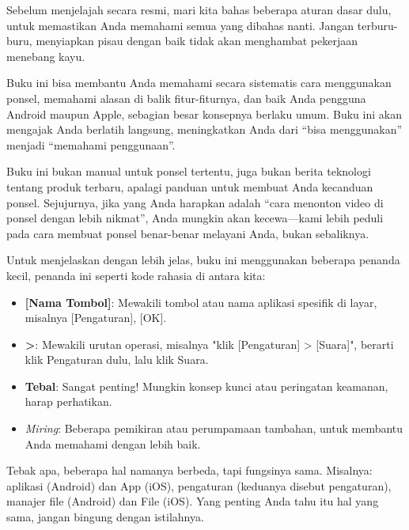 
Sebelum menjelajah secara resmi, mari kita bahas beberapa aturan dasar dulu, untuk memastikan Anda memahami semua yang dibahas nanti. Jangan terburu-buru, menyiapkan pisau dengan baik tidak akan menghambat pekerjaan menebang kayu.


Buku ini bisa membantu Anda memahami secara sistematis cara menggunakan ponsel, memahami alasan di balik fitur-fiturnya, dan baik Anda pengguna Android maupun Apple, sebagian besar konsepnya berlaku umum. Buku ini akan mengajak Anda berlatih langsung, meningkatkan Anda dari “bisa menggunakan” menjadi “memahami penggunaan”.

Buku ini bukan manual untuk ponsel tertentu, juga bukan berita teknologi tentang produk terbaru, apalagi panduan untuk membuat Anda kecanduan ponsel. Sejujurnya, jika yang Anda harapkan adalah “cara menonton video di ponsel dengan lebih nikmat”, Anda mungkin akan kecewa—kami lebih peduli pada cara membuat ponsel benar-benar melayani Anda, bukan sebaliknya.


Untuk menjelaskan dengan lebih jelas, buku ini menggunakan beberapa penanda kecil, penanda ini seperti kode rahasia di antara kita:

\begin{itemize}
  \item \textbf{[Nama Tombol]}: Mewakili tombol atau nama aplikasi spesifik di layar, misalnya [Pengaturan], [OK].
  \item \textbf{>}: Mewakili urutan operasi, misalnya "klik [Pengaturan] > [Suara]", berarti klik Pengaturan dulu, lalu klik Suara.
  \item \textbf{Tebal}: Sangat penting! Mungkin konsep kunci atau peringatan keamanan, harap perhatikan.
  \item \emph{Miring}: Beberapa pemikiran atau perumpamaan tambahan, untuk membantu Anda memahami dengan lebih baik.
\end{itemize}


Tebak apa, beberapa hal namanya berbeda, tapi fungsinya sama. Misalnya: aplikasi (Android) dan App (iOS), pengaturan (keduanya disebut pengaturan), manajer file (Android) dan File (iOS). Yang penting Anda tahu itu hal yang sama, jangan bingung dengan istilahnya.

